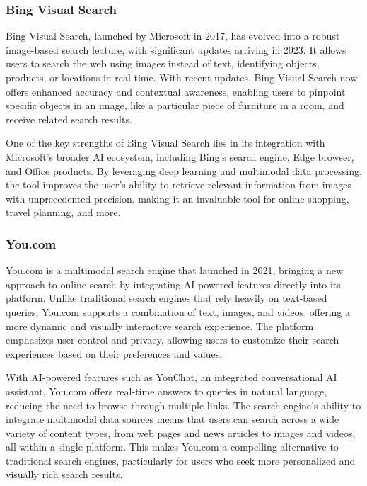 \subsubsection{Bing Visual Search}

Bing Visual Search, launched by Microsoft in 2017, has evolved into a robust image-based search feature, with significant updates arriving in 2023. 
It allows users to search the web using images instead of text, identifying objects, products, or locations in real time. 
With recent updates, Bing Visual Search now offers enhanced accuracy and contextual awareness, enabling users to pinpoint specific objects in an image, like a particular piece of furniture in a room, and receive related search results.

One of the key strengths of Bing Visual Search lies in its integration with Microsoft’s broader AI ecosystem, including Bing’s search engine, Edge browser, and Office products. 
By leveraging deep learning and multimodal data processing, the tool improves the user’s ability to retrieve relevant information from images with unprecedented precision, making it an invaluable tool for online shopping, travel planning, and more.

\subsubsection{You.com}

You.com is a multimodal search engine that launched in 2021, bringing a new approach to online search by integrating AI-powered features directly into its platform. 
Unlike traditional search engines that rely heavily on text-based queries, You.com supports a combination of text, images, and videos, offering a more dynamic and visually interactive search experience. 
The platform emphasizes user control and privacy, allowing users to customize their search experiences based on their preferences and values.

With AI-powered features such as YouChat, an integrated conversational AI assistant, You.com offers real-time answers to queries in natural language, reducing the need to browse through multiple links. 
The search engine's ability to integrate multimodal data sources means that users can search across a wide variety of content types, from web pages and news articles to images and videos, all within a single platform. 
This makes You.com a compelling alternative to traditional search engines, particularly for users who seek more personalized and visually rich search results.

